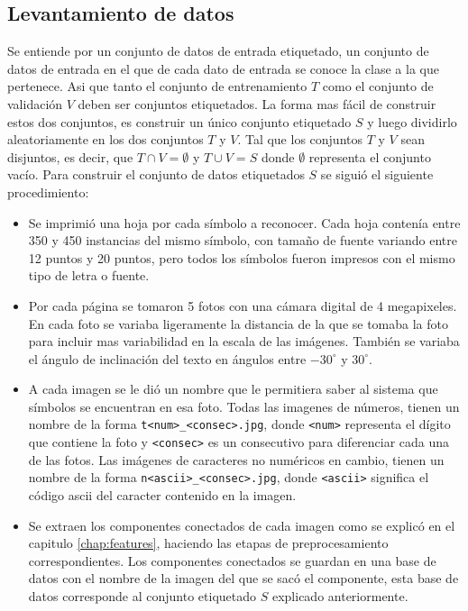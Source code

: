 \documentclass[a4paper, 11pt, oneside]{report}
\begin{document}
\subsection{Levantamiento de datos}

Se entiende por un conjunto de datos de entrada etiquetado, un conjunto de datos de entrada en el que de cada dato de entrada se conoce la clase a la que pertenece. Asi que tanto el conjunto de entrenamiento $T$ como el conjunto de validación $V$ deben ser conjuntos etiquetados.\newline \newline
La forma mas fácil de construir estos dos conjuntos, es construir un único conjunto etiquetado $S$ y luego dividirlo aleatoriamente en los dos conjuntos $T$ y $V$. Tal que los conjuntos $T$ y $V$ sean disjuntos, es decir, que $T \cap V = \emptyset$ y $T \cup V = S$ donde $\emptyset$ representa el conjunto vacío.\newline\newline
Para construir el conjunto de datos etiquetados $S$ se siguió el siguiente procedimiento:
\begin{itemize}
	\item Se imprimió una hoja por cada símbolo a reconocer. Cada hoja contenía entre 350 y 450 instancias del mismo símbolo, con tamaño de fuente variando entre 12 puntos y 20 puntos, pero todos los símbolos fueron impresos con el mismo tipo de letra o fuente.
	\item Por cada página se tomaron 5 fotos con una cámara digital de 4 megapixeles. En cada foto se variaba ligeramente la distancia de la que se tomaba la foto para incluir mas variabilidad en la escala de las imágenes. También se variaba el ángulo de inclinación del texto en ángulos entre $-30^\circ$ y $30^\circ$.
	\item A cada imagen se le dió un nombre que le permitiera saber al sistema que símbolos se encuentran en esa foto. Todas las imagenes de números, tienen un nombre de la forma \verb/t<num>_<consec>.jpg/, donde \verb/<num>/ representa el dígito que contiene la foto y \verb/<consec>/ es un consecutivo para diferenciar cada una de las fotos. Las imágenes de caracteres no numéricos en cambio, tienen un nombre de la forma \verb/n<ascii>_<consec>.jpg/, donde \verb/<ascii>/ significa el código ascii del caracter contenido en la imagen.
	\item Se extraen los componentes conectados de cada imagen como se explicó en el capitulo \ref{chap:features}, haciendo las etapas de preprocesamiento correspondientes. Los componentes conectados se guardan en una base de datos con el nombre de la imagen del que se sacó el componente, esta base de datos corresponde al conjunto etiquetado $S$ explicado anteriormente.
\end{itemize}
\end{document}
